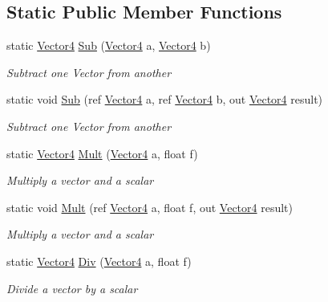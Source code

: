 \subsection*{Static Public Member Functions}
\begin{DoxyCompactItemize}
\item 
static \hyperlink{struct_open_t_k_1_1_vector4}{Vector4} \hyperlink{struct_open_t_k_1_1_vector4_a72907b9b79f1c2132b2f5b72efd7c68f}{Sub} (\hyperlink{struct_open_t_k_1_1_vector4}{Vector4} a, \hyperlink{struct_open_t_k_1_1_vector4}{Vector4} b)
\begin{DoxyCompactList}\small\item\em Subtract one Vector from another \end{DoxyCompactList}\item 
static void \hyperlink{struct_open_t_k_1_1_vector4_a3760ac182284b4c36155490ab204c87c}{Sub} (ref \hyperlink{struct_open_t_k_1_1_vector4}{Vector4} a, ref \hyperlink{struct_open_t_k_1_1_vector4}{Vector4} b, out \hyperlink{struct_open_t_k_1_1_vector4}{Vector4} result)
\begin{DoxyCompactList}\small\item\em Subtract one Vector from another \end{DoxyCompactList}\item 
static \hyperlink{struct_open_t_k_1_1_vector4}{Vector4} \hyperlink{struct_open_t_k_1_1_vector4_a5c6b6c83b904b480711de082625c2915}{Mult} (\hyperlink{struct_open_t_k_1_1_vector4}{Vector4} a, float f)
\begin{DoxyCompactList}\small\item\em Multiply a vector and a scalar \end{DoxyCompactList}\item 
static void \hyperlink{struct_open_t_k_1_1_vector4_a8abd60a2a071d3788ec5d8dea9903ef0}{Mult} (ref \hyperlink{struct_open_t_k_1_1_vector4}{Vector4} a, float f, out \hyperlink{struct_open_t_k_1_1_vector4}{Vector4} result)
\begin{DoxyCompactList}\small\item\em Multiply a vector and a scalar \end{DoxyCompactList}\item 
static \hyperlink{struct_open_t_k_1_1_vector4}{Vector4} \hyperlink{struct_open_t_k_1_1_vector4_aaee808c21dfa0e2f938f34b19175d39b}{Div} (\hyperlink{struct_open_t_k_1_1_vector4}{Vector4} a, float f)
\begin{DoxyCompactList}\small\item\em Divide a vector by a scalar \end{DoxyCompactList}\item 

\end{DoxyCompactItemize}
